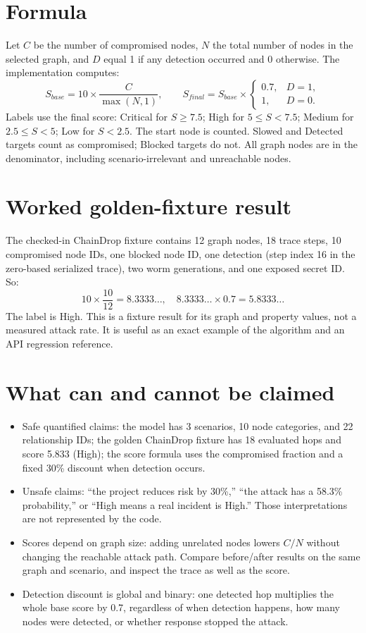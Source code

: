 \documentclass[11pt,oneside]{book}
\begin{document}
\section{Formula}
Let $C$ be the number of compromised nodes, $N$ the total number of nodes in the selected graph, and $D$ equal 1 if any detection occurred and 0 otherwise. The implementation computes:
\[
S_{base}=10\times\frac{C}{\max(N,1)},\qquad
S_{final}=S_{base}\times\begin{cases}0.7,&D=1,\\1,&D=0.\end{cases}
\]
Labels use the final score: Critical for $S\ge7.5$; High for $5\le S<7.5$; Medium for $2.5\le S<5$; Low for $S<2.5$. The start node is counted. Slowed and Detected targets count as compromised; Blocked targets do not. All graph nodes are in the denominator, including scenario-irrelevant and unreachable nodes.

\section{Worked golden-fixture result}
The checked-in ChainDrop fixture contains 12 graph nodes, 18 trace steps, 10 compromised node IDs, one blocked node ID, one detection (step index 16 in the zero-based serialized trace), two worm generations, and one exposed secret ID. So:
\[
10\times\frac{10}{12}=8.3333\ldots,\quad 8.3333\ldots\times0.7=5.8333\ldots
\]
The label is High. This is a fixture result for its graph and property values, not a measured attack rate. It is useful as an exact example of the algorithm and an API regression reference.

\section{What can and cannot be claimed}
\begin{itemize}
\item Safe quantified claims: the model has 3 scenarios, 10 node categories, and 22 relationship IDs; the golden ChainDrop fixture has 18 evaluated hops and score 5.833 (High); the score formula uses the compromised fraction and a fixed 30\% discount when detection occurs.
\item Unsafe claims: ``the project reduces risk by 30\%,'' ``the attack has a 58.3\% probability,'' or ``High means a real incident is High.'' Those interpretations are not represented by the code.
\item Scores depend on graph size: adding unrelated nodes lowers $C/N$ without changing the reachable attack path. Compare before/after results on the same graph and scenario, and inspect the trace as well as the score.
\item Detection discount is global and binary: one detected hop multiplies the whole base score by 0.7, regardless of when detection happens, how many nodes were detected, or whether response stopped the attack.
\end{itemize}
\end{document}
